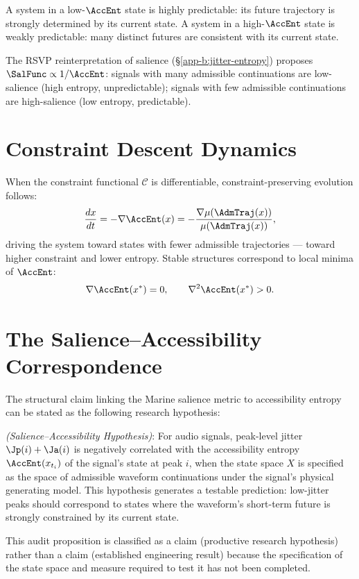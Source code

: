 \begin{proposition}
A system in a low-$\AccEnt$ state is highly predictable:
its future trajectory is strongly determined by its
current state. A system in a high-$\AccEnt$ state is
weakly predictable: many distinct futures are consistent
with its current state.
\end{proposition}

The RSVP reinterpretation of salience (\S\ref{app-b:jitter-entropy})
proposes $\SalFunc \propto 1/\AccEnt$: signals with
many admissible continuations are low-salience (high
entropy, unpredictable); signals with few admissible
continuations are high-salience (low entropy, predictable).

\section{Constraint Descent Dynamics}
\label{app-e:constraint-descent}

When the constraint functional $\mathcal{C}$ is
differentiable, constraint-preserving evolution follows:
\[
  \frac{dx}{dt} = -\nabla \AccEnt(x) = -\frac{\nabla\mu(\AdmTraj(x))}{\mu(\AdmTraj(x))},
\]
driving the system toward states with fewer admissible
trajectories --- toward higher constraint and lower
entropy. Stable structures correspond to local minima
of $\AccEnt$:
\[
  \nabla \AccEnt(x^\ast) = 0, \qquad
  \nabla^2 \AccEnt(x^\ast) > 0.
\]

\section{The Salience--Accessibility Correspondence}
\label{app-e:sal-acc}

The structural claim linking the Marine salience metric
to accessibility entropy can be stated as the following
research hypothesis:

\begin{auditprop}
\label{ap:salience-accessibility}
\textit{(Salience--Accessibility Hypothesis)}: For
audio signals, peak-level jitter $\Jp(i) + \Ja(i)$
is negatively correlated with the accessibility entropy
$\AccEnt(x_{t_i})$ of the signal's state at peak $i$,
when the state space $X$ is specified as the space
of admissible waveform continuations under the signal's
physical generating model. This hypothesis generates
a testable prediction: low-jitter peaks should correspond
to states where the waveform's short-term future is
strongly constrained by its current state.
\end{auditprop}

This audit proposition is classified as a \LevelII{}
claim (productive research hypothesis) rather than
a \LevelI{} claim (established engineering result)
because the specification of the state space and measure
required to test it has not been completed.

